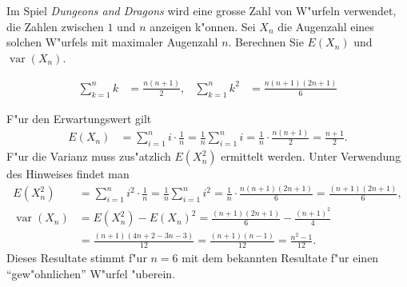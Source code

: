 Im Spiel {\it Dungeons and Dragons} wird eine grosse Zahl von W"urfeln
verwendet, die Zahlen zwischen $1$ und $n$ anzeigen k"onnen. Sei $X_n$ 
die Augenzahl eines solchen W"urfels mit maximaler Augenzahl $n$. 
Berechnen Sie $E(X_n)$ und $\operatorname{var}(X_n)$.

\begin{hinweis}
\begin{align*}
\sum_{k=1}^nk&=\frac{n(n+1)}2,&
\sum_{k=1}^nk^2&=\frac{n(n+1)(2n+1)}6
\end{align*}
\end{hinweis}

\begin{loesung}
F"ur den Erwartungswert gilt
\begin{align*}
E(X_n)&=\sum_{i=1}^n i\cdot \frac1n=\frac1n\sum_{i=1}^ni
=\frac1n\cdot\frac{n(n+1)}2=\frac{n+1}2.
\end{align*}
F"ur die Varianz muss zus"atzlich $E(X_n^2)$ ermittelt werden.
Unter Verwendung des Hinweises findet man
\begin{align*}
E(X_n^2)&=\sum_{i=1}^n i^2\cdot \frac1n=\frac1n\sum_{i=1}^ni^2
=\frac1n\cdot\frac{n(n+1)(2n+1)}6
=\frac{(n+1)(2n+1)}6,\\
\operatorname{var}(X_n)&=E(X_n^2)-E(X_n)^2
=\frac{(n+1)(2n+1)}6-\frac{(n+1)^2}4\\
&=\frac{(n+1)(4n + 2 - 3n - 3)}{12}
=\frac{(n+1)(n - 1)}{12}
=\frac{n^2-1}{12}.
\end{align*}
Dieses Resultate stimmt f"ur $n=6$ mit dem bekannten Resultate f"ur einen
``gew"ohnlichen'' W"urfel "uberein.
\end{loesung}

